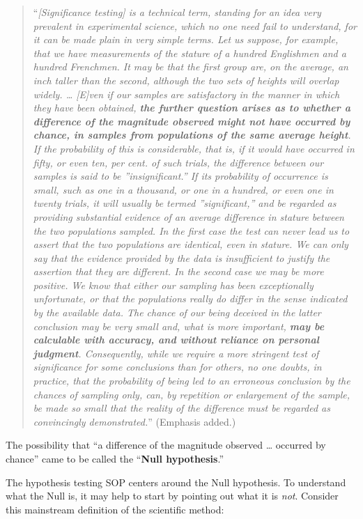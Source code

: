 \documentclass[
  letterpaper,
  DIV=11,
  numbers=noendperiod,
  oneside]{scrartcl}
\begin{document}
\begin{quote}
``\emph{{[}Significance testing{]} is a technical term, standing for an
idea very prevalent in experimental science, which no one need fail to
understand, for it can be made plain in very simple terms. Let us
suppose, for example, that we have measurements of the stature of a
hundred Englishmen and a hundred Frenchmen. It may be that the first
group are, on the average, an inch taller than the second, although the
two sets of heights will overlap widely. \ldots{} {[}E{]}ven if our
samples are satisfactory in the manner in which they have been obtained,
\textbf{the further question arises as to whether a difference of the
magnitude observed might not have occurred by chance, in samples from
populations of the same average height}. If the probability of this is
considerable, that is, if it would have occurred in fifty, or even ten,
per cent. of such trials, the difference between our samples is said to
be ''insignificant.'' If its probability of occurrence is small, such as
one in a thousand, or one in a hundred, or even one in twenty trials, it
will usually be termed ''significant,'' and be regarded as providing
substantial evidence of an average difference in stature between the two
populations sampled. In the first case the test can never lead us to
assert that the two populations are identical, even in stature. We can
only say that the evidence provided by the data is insufficient to
justify the assertion that they are different. In the second case we may
be more positive. We know that either our sampling has been
exceptionally unfortunate, or that the populations really do differ in
the sense indicated by the available data. The chance of our being
deceived in the latter conclusion may be very small and, what is more
important, \textbf{may be calculable with accuracy, and without reliance
on personal judgment}. Consequently, while we require a more stringent
test of significance for some conclusions than for others, no one
doubts, in practice, that the probability of being led to an erroneous
conclusion by the chances of sampling only, can, by repetition or
enlargement of the sample, be made so small that the reality of the
difference must be regarded as convincingly demonstrated.}'' (Emphasis
added.)
\end{quote}

The possibility that ``a difference of the magnitude observed \ldots{}
occurred by chance'' came to be called the ``\textbf{Null hypothesis}.''

The hypothesis testing SOP centers around the Null hypothesis. To
understand what the Null is, it may help to start by pointing out what
it is \emph{not}. Consider this mainstream definition of the scientific
method:
\end{document}
